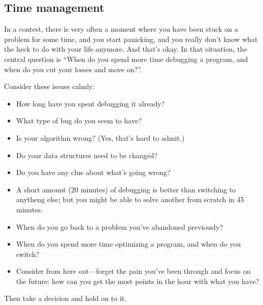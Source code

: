 \subsection{Time management}

In a contest, there is very often a moment where you have been stuck on
a problem for some time, and you start panicking, and you really don't know
what the heck to do with your life anymore.
And that's okay.
In that situation,
the central question is ``When do you spend more time debugging a program,
and when do you cut your losses and move on?''.

Consider these issues calmly:
\begin{itemize}
    \item How long have you spent debugging it already?
    \item What type of bug do you seem to have?
    \item Is your algorithm wrong? (Yes, that's hard to admit.)
    \item Do your data structures need to be changed?
    \item Do you have any clue about what's going wrong?
    \item A short amount (20 minutes) of debugging is better than switching
        to anytheng else; but you might be able to solve another from scratch
        in 45 minutes.
    \item When do you go back to a problem you've abandoned previously?
    \item When do you spend more time optimizing a program, and when do you
        switch?
    \item Consider from here out---forget the pain you've been through and
        focus on the future: how can you get the most points in the hour
        with what you have?
\end{itemize}

Then take a decision and hold on to it.
